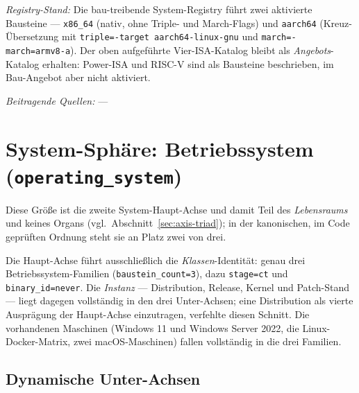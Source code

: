 \emph{Registry-Stand:} Die bau-treibende System-Registry führt zwei aktivierte Bausteine --- \texttt{x86\_\allowbreak{}64} (nativ, ohne Triple- und March-Flags) und \texttt{aarch64} (Kreuz-Übersetzung mit \texttt{triple=\allowbreak{}-target aarch64-linux-gnu} und \texttt{march=\allowbreak{}-march=armv8-a}). Der oben aufgeführte Vier-ISA-Katalog bleibt als \emph{Angebots}-Katalog erhalten: Power-ISA und RISC-V sind als Bausteine beschrieben, im Bau-Angebot aber nicht aktiviert.

\emph{Beitragende Quellen:} ---

\section{System-Sphäre: Betriebssystem (\texttt{operating\_system})}

Diese Größe ist die zweite System-Haupt-Achse und damit Teil des \emph{Lebensraums} und keines Organs (vgl.\ Abschnitt~\ref{sec:axis-triad}); in der kanonischen, im Code geprüften Ordnung steht sie an Platz zwei von drei.

Die Haupt-Achse führt ausschließlich die \emph{Klassen}-Identität: genau drei Betriebssystem-Familien (\texttt{baustein\_\allowbreak{}count=3}), dazu \texttt{stage=ct} und \texttt{binary\_\allowbreak{}id=never}. Die \emph{Instanz} --- Distribution, Release, Kernel und Patch-Stand --- liegt dagegen vollständig in den drei Unter-Achsen; eine Distribution als vierte Ausprägung der Haupt-Achse einzutragen, verfehlte diesen Schnitt. Die vorhandenen Maschinen (Windows 11 und Windows Server 2022, die Linux-Docker-Matrix, zwei macOS-Maschinen) fallen vollständig in die drei Familien.

\subsection*{Dynamische Unter-Achsen}

